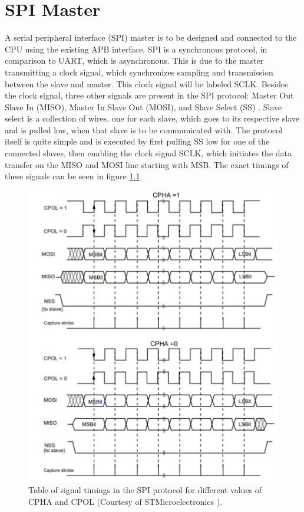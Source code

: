 \documentclass[./dissertation.tex]{subfiles}
\begin{document}
\chapter{SPI Master}
\label{spi_sec}
A serial peripheral interface (SPI) master is to be designed and connected to the CPU using the existing APB interface. SPI is a synchronous protocol, in comparison to UART, which is asynchronous. This is due to the master transmitting a clock signal, which synchronizes sampling and transmission between the slave and master. This clock signal will be labeled SCLK. Besides the clock signal, three other signals are present in the SPI protocol: Master Out Slave In (MISO), Master In Slave Out (MOSI), and Slave Select (SS) \cite{SPIManualSTM}. Slave select is a collection of wires, one for each slave, which goes to its respective slave and is pulled low, when that slave is to be communicated with. The protocol itself is quite simple and is executed by first pulling SS low for one of the connected slaves, then enabling the clock signal SCLK, which initiates the data transfer on the MISO and MOSI line starting with MSB. The exact timings of these signals can be seen in figure \ref{fig:spi_timings}.

\begin{figure}[H]
    \centering
    \includegraphics[width=\linewidth]{subfiles/imgs/IP_Blocks_Pics/spi_signal_diagram.pdf}
    \caption{Table of signal timings in the SPI protocol for different values of CPHA and CPOL (Courtesy of STMicroelectronics \cite{SPIManualSTM}).}
    \label{fig:spi_timings}
\end{figure}
\end{document}
